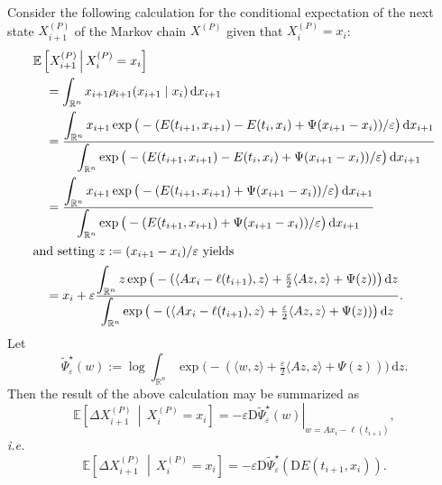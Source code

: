 \documentclass[reqno]{amsart}
\theoremstyle{definition}
\begin{document}
Consider the following calculation for the conditional expectation of the next state $X_{i + 1}^{(P)}$ of the Markov chain $X^{(P)}$ given that $X_{i}^{(P)} = x_{i}$:
\begin{align*}
	& {\mathbb{E}} \left[ X_{i + 1}^{(P)} \,\middle|\, X_{i}^{(P)} = x_{i} \right] \\
	& \quad = \int_{{\mathbb{R}}^{n}} x_{i + 1} \rho_{i + 1} ( x_{i + 1} \mid x_{i} ) \, {\mathrm{d}} x_{i + 1} \\
	& \quad = \frac{\displaystyle \int_{{\mathbb{R}}^{n}} x_{i + 1} \exp \big( - (E(t_{i + 1}, x_{i + 1}) - E(t_{i}, x_{i}) + \Psi(x_{i + 1} - x_{i}))/ {\varepsilon} \big) \, {\mathrm{d}} x_{i + 1}}{\displaystyle \int_{{\mathbb{R}}^{n}} \exp \big( - (E(t_{i + 1}, x_{i + 1}) - E(t_{i}, x_{i}) + \Psi(x_{i + 1} - x_{i}))/ {\varepsilon} \big) \, {\mathrm{d}} x_{i + 1}} \\
	& \quad = \frac{\displaystyle \int_{{\mathbb{R}}^{n}} x_{i + 1} \exp \big( - (E(t_{i + 1}, x_{i + 1}) + \Psi(x_{i + 1} - x_{i}))/ {\varepsilon} \big) \, {\mathrm{d}} x_{i + 1}}{\displaystyle \int_{{\mathbb{R}}^{n}} \exp \big( - (E(t_{i + 1}, x_{i + 1}) + \Psi(x_{i + 1} - x_{i}))/ {\varepsilon} \big) \, {\mathrm{d}} x_{i + 1}} \\
	\intertext{and setting $z := (x_{i + 1} - x_{i}) / {\varepsilon}$ yields}
	& \quad = x_{i} + {\varepsilon} \frac{\displaystyle \int_{{\mathbb{R}}^{n}} z \exp \big( - ( \langle A x_{i} - \ell(t_{i + 1}), z \rangle + \tfrac{\varepsilon}{2} \langle A z, z \rangle + \Psi(z)) \big) \, {\mathrm{d}} z}{\displaystyle \int_{{\mathbb{R}}^{n}} \exp \big( - ( \langle A x_{i} - \ell(t_{i + 1}), z \rangle + \tfrac{\varepsilon}{2} \langle A z, z \rangle + \Psi(z)) \big) \, {\mathrm{d}} z}.
\end{align*}
Let
\begin{equation}
	\label{eq:Psitilde_eps_quadratic}
	{\widetilde{\Psi}}_{\varepsilon}^{\star} (w) := \log \int_{{\mathbb{R}}^{n}} \exp \big( - (\langle w, z \rangle + \tfrac{\varepsilon}{2} \langle A z, z \rangle + \Psi(z)) \big) \, {\mathrm{d}} z.
\end{equation}
Then the result of the above calculation may be summarized as
\[
	{\mathbb{E}} \left[ \Delta X_{i + 1}^{(P)} \,\middle|\, X_{i}^{(P)} = x_{i} \right] = \left. - {\varepsilon} {\mathrm{D}} {\widetilde{\Psi}}_{\varepsilon}^{\star} (w) \right|_{w = A x_{i} - \ell(t_{i + 1})},
\]
\emph{i.e.}
\[
	{\mathbb{E}} \left[ \Delta X_{i + 1}^{(P)} \,\middle|\, X_{i}^{(P)} = x_{i} \right] = - {\varepsilon} {\mathrm{D}} {\widetilde{\Psi}}_{\varepsilon}^{\star} ({\mathrm{D}} E(t_{i + 1}, x_{i})).
\]
\end{document}
